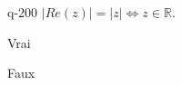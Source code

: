 \begin{truefalse}{q-200}
$|Re(z)|=|z| \iff z\in \mathbb R$.
\item* Vrai
\item Faux
\end{truefalse}


